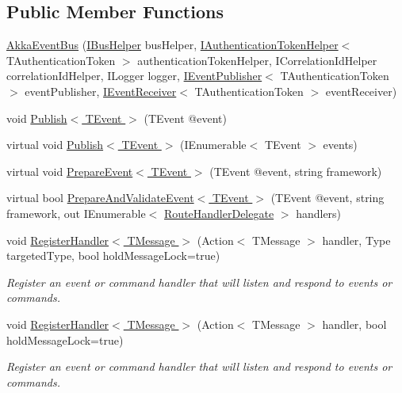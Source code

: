\subsection*{Public Member Functions}
\begin{DoxyCompactItemize}
\item 
\hyperlink{classCqrs_1_1Akka_1_1Events_1_1AkkaEventBus_ab1f292c21b5516a89fdcc019deb04063_ab1f292c21b5516a89fdcc019deb04063}{Akka\+Event\+Bus} (\hyperlink{interfaceCqrs_1_1Bus_1_1IBusHelper}{I\+Bus\+Helper} bus\+Helper, \hyperlink{interfaceCqrs_1_1Authentication_1_1IAuthenticationTokenHelper}{I\+Authentication\+Token\+Helper}$<$ T\+Authentication\+Token $>$ authentication\+Token\+Helper, I\+Correlation\+Id\+Helper correlation\+Id\+Helper, I\+Logger logger, \hyperlink{interfaceCqrs_1_1Events_1_1IEventPublisher}{I\+Event\+Publisher}$<$ T\+Authentication\+Token $>$ event\+Publisher, \hyperlink{interfaceCqrs_1_1Events_1_1IEventReceiver}{I\+Event\+Receiver}$<$ T\+Authentication\+Token $>$ event\+Receiver)
\item 
void \hyperlink{classCqrs_1_1Akka_1_1Events_1_1AkkaEventBus_aaba5d37020e21d03cc2bbc3da14f45ea_aaba5d37020e21d03cc2bbc3da14f45ea}{Publish$<$ T\+Event $>$} (T\+Event @event)
\item 
virtual void \hyperlink{classCqrs_1_1Akka_1_1Events_1_1AkkaEventBus_ad5b996dd77efbf51a2b5a32f94417772_ad5b996dd77efbf51a2b5a32f94417772}{Publish$<$ T\+Event $>$} (I\+Enumerable$<$ T\+Event $>$ events)
\item 
virtual void \hyperlink{classCqrs_1_1Akka_1_1Events_1_1AkkaEventBus_ae9d248ec73204a7909c04e5a87bfeefb_ae9d248ec73204a7909c04e5a87bfeefb}{Prepare\+Event$<$ T\+Event $>$} (T\+Event @event, string framework)
\item 
virtual bool \hyperlink{classCqrs_1_1Akka_1_1Events_1_1AkkaEventBus_a1a89590afc6970f00fe055961a6773e8_a1a89590afc6970f00fe055961a6773e8}{Prepare\+And\+Validate\+Event$<$ T\+Event $>$} (T\+Event @event, string framework, out I\+Enumerable$<$ \hyperlink{classCqrs_1_1Bus_1_1RouteHandlerDelegate}{Route\+Handler\+Delegate} $>$ handlers)
\item 
void \hyperlink{classCqrs_1_1Akka_1_1Events_1_1AkkaEventBus_a59ec3e497e511b73b5239eee80691443_a59ec3e497e511b73b5239eee80691443}{Register\+Handler$<$ T\+Message $>$} (Action$<$ T\+Message $>$ handler, Type targeted\+Type, bool hold\+Message\+Lock=true)
\begin{DoxyCompactList}\small\item\em Register an event or command handler that will listen and respond to events or commands. \end{DoxyCompactList}\item 
void \hyperlink{classCqrs_1_1Akka_1_1Events_1_1AkkaEventBus_a6795dfcaf611ce1b50310f442cef0546_a6795dfcaf611ce1b50310f442cef0546}{Register\+Handler$<$ T\+Message $>$} (Action$<$ T\+Message $>$ handler, bool hold\+Message\+Lock=true)
\begin{DoxyCompactList}\small\item\em Register an event or command handler that will listen and respond to events or commands. \end{DoxyCompactList}\end{DoxyCompactItemize}
